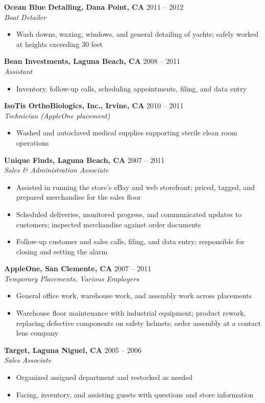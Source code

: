 \documentclass[letterpaper,10.5pt]{article}
\newcommand{\role}[3]{%
  \vspace{3pt}%
  \textbf{#1} \hfill {\small #3}\\[1pt]%
  {\small\itshape #2}\vspace{-2pt}%
}
\begin{document}
\role{Ocean Blue Detailing, Dana Point, CA}{Boat Detailer}{2011 -- 2012}
\begin{itemize}
  \item Wash downs, waxing, windows, and general detailing of yachts; safely worked at heights
        exceeding 30 feet
\end{itemize}

\role{Bean Investments, Laguna Beach, CA}{Assistant}{2008 -- 2011}
\begin{itemize}
  \item Inventory, follow-up calls, scheduling appointments, filing, and data entry
\end{itemize}

\role{IsoTis OrthoBiologics, Inc., Irvine, CA}{Technician (AppleOne placement)}{2010 -- 2011}
\begin{itemize}
  \item Washed and autoclaved medical supplies supporting sterile clean room operations
\end{itemize}

\role{Unique Finds, Laguna Beach, CA}{Sales \& Administration Associate}{2007 -- 2011}
\begin{itemize}
  \item Assisted in running the store's eBay and web storefront; priced, tagged, and prepared
        merchandise for the sales floor
  \item Scheduled deliveries, monitored progress, and communicated updates to customers; inspected
        merchandise against order documents
  \item Follow-up customer and sales calls, filing, and data entry; responsible for closing and
        setting the alarm
\end{itemize}

\role{AppleOne, San Clemente, CA}{Temporary Placements, Various Employers}{2007 -- 2011}
\begin{itemize}
  \item General office work, warehouse work, and assembly work across placements
  \item Warehouse floor maintenance with industrial equipment; product rework, replacing defective
        components on safety helmets; order assembly at a contact lens company
\end{itemize}

\role{Target, Laguna Niguel, CA}{Sales Associate}{2005 -- 2006}
\begin{itemize}
  \item Organized assigned department and restocked as needed
  \item Facing, inventory, and assisting guests with questions and store information
\end{itemize}
\end{document}
